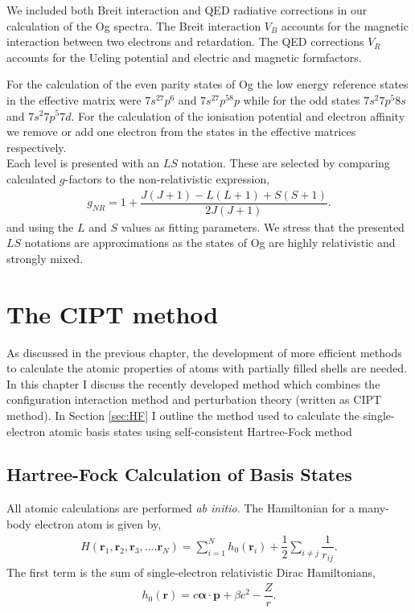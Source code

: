 \documentclass[8pt,a4paper, twoside]{report}
\begin{document}
We included both Breit interaction\cite{Breit1929, Mann1971, DF2016}  and QED radiative corrections in our calculation of the Og spectra.  The Breit interaction $V_B$ accounts for the magnetic interaction between two electrons and retardation. The QED corrections $V_R$ accounts for the Ueling potential and electric and magnetic formfactors\cite{FG2005}. 

For the calculation of the even parity states of Og the low energy reference states in the effective matrix were $7s^27p^6$ and $7s^27p^58p$ while for the odd states $7s^2 7p^5 8s$ and $7s^2 7p^5 7d$. For the calculation of the ionisation potential and electron affinity we remove or add one electron from the states in the effective matrices respectively.\\
 
Each level is presented with an $LS$ notation. These are selected by comparing calculated $g$-factors to the non-relativistic expression,
\begin{align} 
g_{NR} =  1 + \dfrac{J(J + 1) - L(L+1) + S(S+1)}{2J(J+1)}.
\end{align}
and using the $L$ and $S$ values as fitting parameters. We stress that the presented $LS$ notations are approximations as the states of Og are highly relativistic and strongly mixed. \\

\chapter{The CIPT method}
As discussed in the previous chapter, the development of more efficient methods to calculate the atomic properties of atoms with partially filled shells are needed. In this chapter I discuss the recently developed method which combines the configuration interaction method and perturbation theory (written as CIPT method). In Section \ref{sec:HF} I outline the method used to calculate the single-electron atomic basis states using self-consistent Hartree-Fock method
\section{Hartree-Fock Calculation of Basis States}
All atomic calculations are performed \textit{ab initio}. The Hamiltonian for a many-body electron atom is given by,
\begin{align}
H\left(\textbf{r}_1,\textbf{r}_2, \textbf{r}_3, .... \textbf{r}_N\right) = \sum_{i=1}^{N} h_0\left(\textbf{r}_i\right) + \dfrac{1}{2}\sum_{i\neq j}\dfrac{1}{r_{ij}}.
\end{align}
The first term is the sum of single-electron relativistic Dirac Hamiltonians,
\begin{align*}
h_0\left(\textbf{r}\right) = c \boldsymbol{\alpha}\cdot\textbf{p} + \beta c^2 - \dfrac{Z}{r}.
\end{align*}
\end{document}
